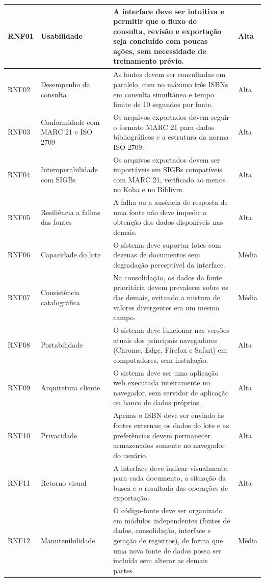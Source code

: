 \begin{apendicesenv}
\begin{longtable}{|p{}|p{}|p{}|p{}|}
    RNF01 & Usabilidade & A interface deve ser intuitiva e permitir que o fluxo de consulta, revisão e exportação seja concluído com poucas ações, sem necessidade de treinamento prévio. & Alta \\ \hline
    RNF02 & Desempenho da consulta & As fontes devem ser consultadas em paralelo, com no máximo três ISBNs em consulta simultânea e tempo limite de 10 segundos por fonte. & Alta \\ \hline
    RNF03 & Conformidade com MARC 21 e ISO 2709 & Os arquivos exportados devem seguir o formato MARC 21 para dados bibliográficos e a estrutura da norma ISO 2709. & Alta \\ \hline
    RNF04 & Interoperabilidade com SIGBs & Os arquivos exportados devem ser importáveis em SIGBs compatíveis com MARC 21, verificado ao menos no Koha e no Biblivre. & Alta \\ \hline
    RNF05 & Resiliência a falhas das fontes & A falha ou a ausência de resposta de uma fonte não deve impedir a obtenção dos dados disponíveis nas demais. & Alta \\ \hline
    RNF06 & Capacidade do lote & O sistema deve suportar lotes com dezenas de documentos sem degradação perceptível da interface. & Média \\ \hline
    RNF07 & Consistência catalográfica & Na consolidação, os dados da fonte prioritária devem prevalecer sobre os das demais, evitando a mistura de valores divergentes em um mesmo campo. & Média \\ \hline
    RNF08 & Portabilidade & O sistema deve funcionar nas versões atuais dos principais navegadores (Chrome, Edge, Firefox e Safari) em computadores, sem instalação. & Alta \\ \hline
    RNF09 & Arquitetura cliente & O sistema deve ser uma aplicação web executada inteiramente no navegador, sem servidor de aplicação ou banco de dados próprios. & Alta \\ \hline
    RNF10 & Privacidade & Apenas o ISBN deve ser enviado às fontes externas; os dados do lote e as preferências devem permanecer armazenados somente no navegador do usuário. & Alta \\ \hline
    RNF11 & Retorno visual & A interface deve indicar visualmente, para cada documento, a situação da busca e o resultado das operações de exportação. & Alta \\ \hline
    RNF12 & Manutenibilidade & O código-fonte deve ser organizado em módulos independentes (fontes de dados, consolidação, interface e geração de registros), de forma que uma nova fonte de dados possa ser incluída sem alterar as demais partes. & Média \\ \hline
\end{longtable}




\end{apendicesenv}

